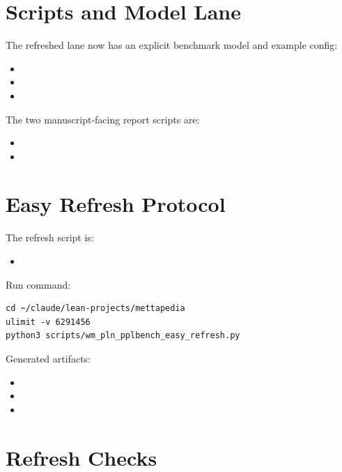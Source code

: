 \documentclass[11pt,openany]{report}
\begin{document}
\section{Scripts and Model Lane}

The refreshed lane now has an explicit benchmark model and example config:
\begin{itemize}
\item {}
\item {}
\item {}
\end{itemize}

The two manuscript-facing report scripts are:
\begin{itemize}
\item {}
\item {}
\end{itemize}

\section{Easy Refresh Protocol}

The refresh script is:
\begin{itemize}
\item {}
\end{itemize}

Run command:
\begin{lstlisting}
cd ~/claude/lean-projects/mettapedia
ulimit -v 6291456
python3 scripts/wm_pln_pplbench_easy_refresh.py
\end{lstlisting}

Generated artifacts:
\begin{itemize}
\item {}
\item {}
\item {}
\end{itemize}

\section{Refresh Checks}
\end{document}
